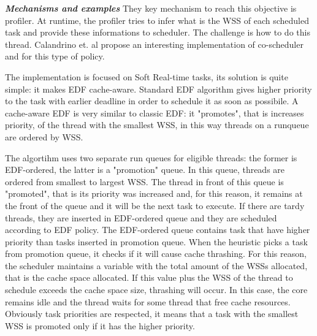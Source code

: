 \begin{description}
\textit{\textbf{Mechanisms and examples}} They key mechanism to reach this objective is profiler. At runtime, the profiler tries to infer what is the WSS 
of each scheduled task and provide these informations to scheduler. The challenge is how to do this thread. 
Calandrino et. al \cite{calandro} propose an interesting implementation of co-scheduler and for this type of policy.

The implementation is focused on Soft Real-time tasks, its solution is quite simple: it makes EDF cache-aware. Standard EDF algorithm gives higher priority 
to the task with earlier deadline in order to schedule it as soon as possibile. A cache-aware EDF is very similar to classic EDF: it "promotes", that is 
increases priority, of the thread with the smallest WSS, in this way threads on a runqueue are ordered by WSS.

The algortihm uses two separate run queues for eligible threads: the former is EDF-ordered, the latter is a "promotion" queue. In this queue, threads are ordered
from smallest to largest WSS. The thread in front of this queue is "promoted", that is its priority was increased and, for this reason, it remains at the front
of the queue and it will be the next task to execute. If there are tardy threads, they are inserted in EDF-ordered queue and they are scheduled according to 
EDF policy. The EDF-ordered queue contains task that have higher priority than tasks inserted in promotion queue.
When the heuristic picks a task from promotion queue, it checks if it will cause cache thrashing. For this reason, the scheduler maintains a variable with 
the total amount of the WSSs allocated, that is the cache space allocated. If this value plus the WSS of the thread to schedule exceeds the cache space size, 
thrashing will occur. In this case, the core remains idle and the thread waits for some thread that free cache resources.
Obviously task priorities are respected, it means that a task with the smallest WSS is promoted only if it has the higher priority.


\end{description}
